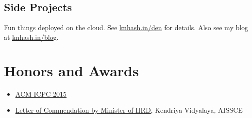 \documentclass[11pt,letterpaper]{article}
\let\oldhref\href
\renewcommand{\href}[2]{\uline{\oldhref{#1}{#2}}}
\begin{document}
\subsection{Side Projects}
Fun things deployed on the cloud. See \href{https://blog.knhash.in/den/}{knhash.in/den} for details. Also see my blog at \href{https://knhash.in/blog}{knhash.in/blog}.

\section{Honors and Awards}

\begin{itemize}
    \item \href{https://knhash.github.io/files/ICPC_2015.pdf}{ACM ICPC 2015}
    \item \href{https://knhash.github.io/files/12th.pdf}{Letter of Commendation by Minister of HRD}, Kendriya Vidyalaya, AISSCE
\end{itemize}
\end{document}
